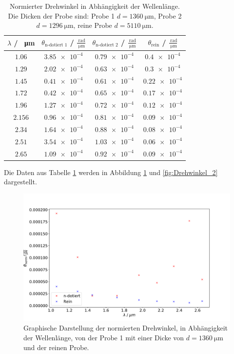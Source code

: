 \begin{table}
  \centering
  \begin{tabular}{c c c c}
    \toprule
    $\lambda$ / \SI{}{\micro\meter}& $\theta_{\text{n-dotiert 1}}$ / $\frac{\SI{}{\radian}}{\SI{}{\micro\meter}}$& 
    $\theta_{\text{n-dotiert 2}}$ / $\frac{\SI{}{\radian}}{\SI{}{\micro\meter}}$&
    $\theta_{\text{rein}}$ / $\frac{\SI{}{\radian}}{\SI{}{\micro\meter}}$\\
    \midrule
    $\num{1.06} $&$\num{3.85e-4}$&$\num{0.79e-4}$&$\num{0.4e-4}$\\
    $\num{1.29} $&$\num{2.02e-4}$&$\num{0.63e-4}$&$\num{0.3e-4}$\\
    $\num{1.45} $&$\num{0.41e-4}$&$\num{0.61e-4}$&$\num{0.22e-4}$\\
    $\num{1.72} $&$\num{0.42e-4}$&$\num{0.65e-4}$&$\num{0.17e-4}$\\
    $\num{1.96} $&$\num{1.27e-4}$&$\num{0.72e-4}$&$\num{0.12e-4}$\\
    $\num{2.156}$&$\num{0.96e-4}$&$\num{0.81e-4}$&$\num{0.09e-4}$\\
    $\num{2.34} $&$\num{1.64e-4}$&$\num{0.88e-4}$&$\num{0.08e-4}$\\
    $\num{2.51} $&$\num{3.54e-4}$&$\num{1.03e-4}$&$\num{0.06e-4}$\\
    $\num{2.65} $&$\num{1.09e-4}$&$\num{0.92e-4}$&$\num{0.09e-4}$\\
    \bottomrule
  \end{tabular}
  \caption{Normierter Drehwinkel in Abhängigkeit der Wellenlänge. Die Dicken der Probe sind: Probe 1 $d=\SI{1360}{\micro\meter}$,
  Probe 2 $d=\SI{1296}{\micro\meter}$, reine Probe $d=\SI{5110}{\micro\meter}$.}
  \label{tab:Drehwinkel_norm}
\end{table}
\FloatBarrier
Die Daten aus Tabelle \ref{tab:Drehwinkel_norm} werden in Abbildung \ref{fig:Drehwinkel_1} und \ref{fig:Drehwinkel_2} 
dargestellt.
\FloatBarrier
\begin{figure}
  \centering
  \includegraphics[width = \textwidth,keepaspectratio]{figure/Theta1_plot.pdf}
  \caption{Graphische Darstellung der normierten Drehwinkel, in Abhängigkeit der Wellenlänge, von der Probe 1 mit einer Dicke von $d=\SI{1360}{\micro\meter}$ und 
  der reinen Probe.}
  \label{fig:Drehwinkel_1}
\end{figure}
